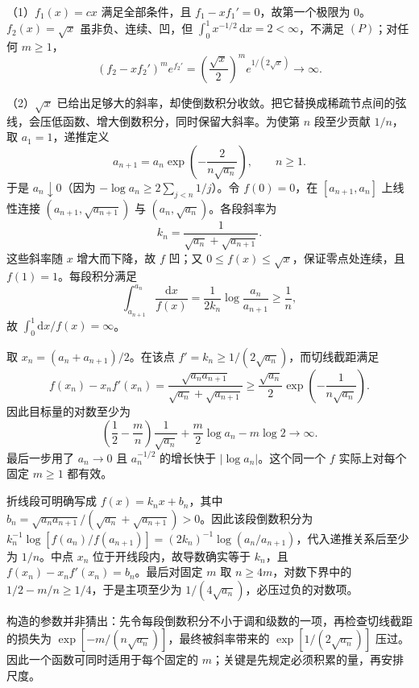 \documentclass[12pt,fontset=fandol]{ctexart}
\begin{document}
\begin{solve}\label{ans:fin12-high:7}

（1）$f_1(x)=cx$ 满足全部条件，且 $f_1-xf_1'=0$，故第一个极限为 $0$。$f_2(x)=\sqrt x$ 虽非负、连续、凹，但 $\int_0^1x^{-1/2}\,\mathrm dx=2<\infty$，不满足 $(P)$；对任何 $m\geq1$，
\[
(f_2-xf_2')^me^{f_2'}=\left(\frac{\sqrt x}{2}\right)^me^{1/(2\sqrt x)}\longrightarrow\infty.
\]

（2）$\sqrt x$ 已给出足够大的斜率，却使倒数积分收敛。把它替换成稀疏节点间的弦线，会压低函数、增大倒数积分，同时保留大斜率。为使第 $n$ 段至少贡献 $1/n$，取 $a_1=1$，递推定义
\[
a_{n+1}=a_n\exp\left(-\frac2{n\sqrt{a_n}}\right),\qquad n\geq1.
\]
于是 $a_n\downarrow0$（因为 $-\log a_n\geq2\sum_{j<n}1/j$）。令 $f(0)=0$，在 $[a_{n+1},a_n]$ 上线性连接 $(a_{n+1},\sqrt{a_{n+1}})$ 与 $(a_n,\sqrt{a_n})$。各段斜率为
\[
k_n=\frac1{\sqrt{a_n}+\sqrt{a_{n+1}}}.
\]
这些斜率随 $x$ 增大而下降，故 $f$ 凹；又 $0\leq f(x)\leq\sqrt x$，保证零点处连续，且 $f(1)=1$。每段积分满足
\[
\int_{a_{n+1}}^{a_n}\frac{\mathrm dx}{f(x)}
=\frac1{2k_n}\log\frac{a_n}{a_{n+1}}\geq\frac1n,
\]
故 $\int_0^1\mathrm dx/f(x)=\infty$。

取 $x_n=(a_n+a_{n+1})/2$。在该点 $f'=k_n\geq1/(2\sqrt{a_n})$，而切线截距满足
\[
f(x_n)-x_nf'(x_n)=\frac{\sqrt{a_na_{n+1}}}{\sqrt{a_n}+\sqrt{a_{n+1}}}
\geq\frac{\sqrt{a_n}}2\exp\left(-\frac1{n\sqrt{a_n}}\right).
\]
因此目标量的对数至少为
\[
\left(\frac12-\frac mn\right)\frac1{\sqrt{a_n}}+\frac m2\log a_n-m\log2\longrightarrow\infty.
\]
最后一步用了 $a_n\to0$ 且 $a_n^{-1/2}$ 的增长快于 $|\log a_n|$。这个同一个 $f$ 实际上对每个固定 $m\geq1$ 都有效。

折线段可明确写成 $f(x)=k_nx+b_n$，其中 $b_n=\sqrt{a_na_{n+1}}/(\sqrt{a_n}+\sqrt{a_{n+1}})>0$。因此该段倒数积分为 $k_n^{-1}\log[f(a_n)/f(a_{n+1})]=(2k_n)^{-1}\log(a_n/a_{n+1})$，代入递推关系后至少为 $1/n$。中点 $x_n$ 位于开线段内，故导数确实等于 $k_n$，且 $f(x_n)-x_nf'(x_n)=b_n$。最后对固定 $m$ 取 $n\ge4m$，对数下界中的 $1/2-m/n\ge1/4$，于是主项至少为 $1/(4\sqrt{a_n})$，必压过负的对数项。

\end{solve}

\begin{remark}[方法与条件]构造的参数并非猜出：先令每段倒数积分不小于调和级数的一项，再检查切线截距的损失为 $\exp[-m/(n\sqrt{a_n})]$，最终被斜率带来的 $\exp[1/(2\sqrt{a_n})]$ 压过。因此一个函数可同时适用于每个固定的 $m$；关键是先规定必须积累的量，再安排尺度。\end{remark}
\end{document}
